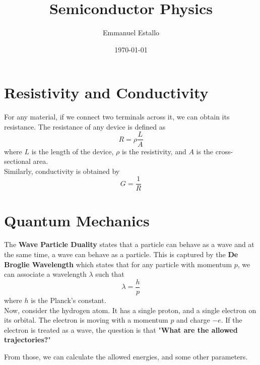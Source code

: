 \documentclass{article}
\title{Semiconductor Physics}
\author{Emmanuel Estallo}
\date{\today}
\begin{document}
\boldmath
\maketitle 
\noindent 
\section{Resistivity and Conductivity}
For any material, if we connect two terminals across it, we can obtain its resistance.
The resistance of any device is defined as $$R = \rho \frac{L}{A}$$ where $L$ is the
length of the device, $\rho$ is the resistivity, and $A$ is the cross-sectional area. 
\vspace{8pt}
\\ Similarly, conductivity is obtained by $$G = \frac{1}{R}$$

\section{Quantum Mechanics}
\noindent 
The \textbf{Wave Particle Duality} states that a particle can behave as a wave and at 
the same time, a wave can behave as a particle. This is captured by the 
\textbf{De Broglie Wavelength} which states that for any particle with momentum $p$,
we can associate a wavelength $\lambda$ such that $$\lambda = \frac{h}{p}$$ where $h$
is the Planck's constant.  
\vspace{8pt}
\\ Now, consider the hydrogen atom. It has a single proton, and a single electron on
its orbital. The electron is moving with a momentum $p$ and charge $-e$. If the electron
is treated as a wave, the question is that "\textbf{What are the allowed trajectories?}" 

\vspace{8pt}
\noindent 
From those, we can calculate the allowed energies, and some other parameters. 
\end{document}
